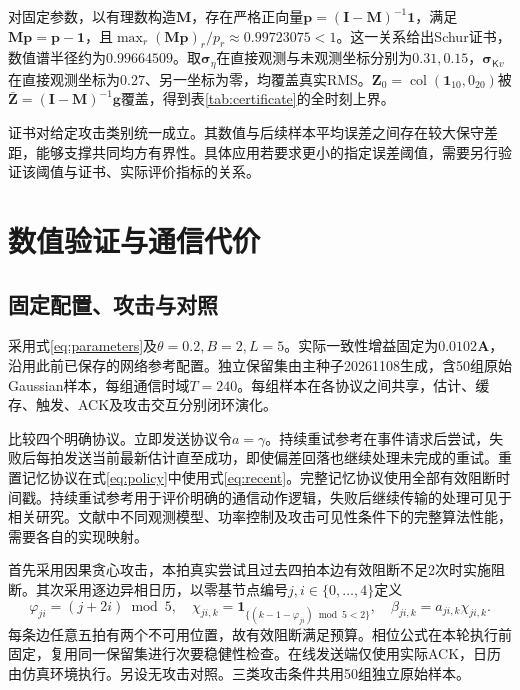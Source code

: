 \documentclass[UTF8,a4paper,zihao=5,fontset=windows]{ctexart}
\newcommand{\ind}{\mathbf 1}
\newcommand{\col}{\operatorname{col}}
\begin{document}
对固定参数，以有理数构造${\bm{M}}$，存在严格正向量${\bm{p}}=({\bm{I}}-{\bm{M}})^{-1}\mathbf1$，满足${\bm{M}}{\bm{p}}={\bm{p}}-\mathbf1$，且$\max_r({\bm{M}}{\bm{p}})_r/p_r\approx0.99723075<1$。这一关系给出Schur证书，数值谱半径约为$0.99664509$。取${\bm{\sigma}}_\eta$在直接观测与未观测坐标分别为$0.31,0.15$，${\bm{\sigma}}_{\mathsf Kv}$在直接观测坐标为$0.27$、另一坐标为零，均覆盖真实RMS。${\bm{Z}}_0=\col(\mathbf1_{10},0_{20})$被$\bar {\bm{Z}}=({\bm{I}}-{\bm{M}})^{-1}{\bm{g}}$覆盖，得到表\ref{tab:certificate}的全时刻上界。



证书对给定攻击类别统一成立。其数值与后续样本平均误差之间存在较大保守差距，能够支撑共同均方有界性。具体应用若要求更小的指定误差阈值，需要另行验证该阈值与证书、实际评价指标的关系。

\section{数值验证与通信代价}\label{sec:experiments}
\subsection{固定配置、攻击与对照}
采用式\eqref{eq:parameters}及$\theta=0.2,B=2,L=5$。实际一致性增益固定为$0.0102{\bm{A}}$，沿用此前已保存的网络参考配置。独立保留集由主种子20261108生成，含50组原始Gaussian样本，每组通信时域$T=240$。每组样本在各协议之间共享，估计、缓存、触发、ACK及攻击交互分别闭环演化。

比较四个明确协议。立即发送协议令$a=\gamma$。持续重试参考在事件请求后尝试，失败后每拍发送当前最新估计直至成功，即使偏差回落也继续处理未完成的重试。重置记忆协议在式\eqref{eq:policy}中使用式\eqref{eq:recent}。完整记忆协议使用全部有效阻断时间戳。持续重试参考用于评价明确的通信动作逻辑，失败后继续传输的处理可见于相关研究\cite{Paper_FUS33_2022}。文献中不同观测模型、功率控制及攻击可见性条件下的完整算法性能，需要各自的实现映射。

首先采用因果贪心攻击，本拍真实尝试且过去四拍本边有效阻断不足2次时实施阻断。其次采用逐边异相日历，以零基节点编号$j,i\in\{0,\ldots,4\}$定义
\begin{equation}
\varphi_{ji}=(j+2i)\bmod5,\quad
\chi_{ji,k}=\ind_{\{(k-1-\varphi_{ji})\bmod5<2\}},\quad
\beta_{ji,k}=a_{ji,k}\chi_{ji,k}.
\label{eq:calendar}
\end{equation}
每条边任意五拍有两个不可用位置，故有效阻断满足预算。相位公式在本轮执行前固定，复用同一保留集进行次要稳健性检查。在线发送端仅使用实际ACK，日历由仿真环境执行。另设无攻击对照。三类攻击条件共用50组独立原始样本。
\end{document}

